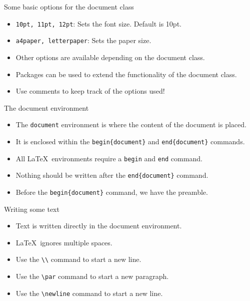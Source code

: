 \documentclass[t,12pt,xcolor=dvipsnames]{beamer}
\begin{document}
\begin{frame}{Some basic options for the document class}
    \begin{itemize}
        \item \texttt{10pt, 11pt, 12pt}: Sets the font size. Default is 10pt.
        \item \texttt{a4paper, letterpaper}: Sets the paper size.
        \item Other options are available depending on the document class.
        \item Packages can be used to extend the functionality of the document class.
        \item Use comments to keep track of the options used!
    \end{itemize}
\end{frame}
\begin{frame}{The document environment}
    \begin{itemize}
        \item The \texttt{document} environment is where the content of the document is placed.
        \item It is enclosed within the \texttt{begin\{document\}} and \texttt{end\{document\}} commands.
        \item  All \LaTeX \ environments require a \texttt{begin} and \texttt{end} command.
        \item Nothing should be written after the \texttt{end\{document\}} command.
        \item Before the \texttt{begin\{document\}} command, we have the preamble.
    \end{itemize}
\end{frame}

\begin{frame}{Writing some text}
    \begin{itemize}
        \item Text is written directly in the document environment.
        \item \LaTeX \ ignores multiple spaces. 
        \item Use the \texttt{\textbackslash\textbackslash} command to start a new line.
        \item Use the \texttt{\textbackslash par} command to start a new paragraph.
        \item Use the \texttt{\textbackslash newline} command to start a new line.
    \end{itemize}
\end{frame}
\end{document}
